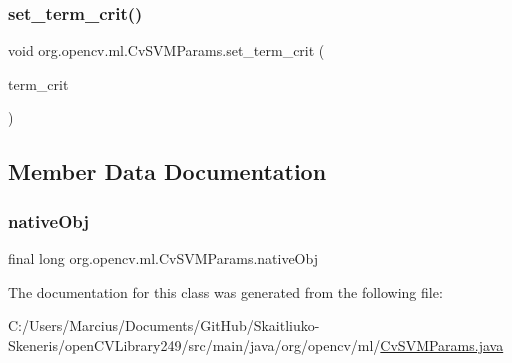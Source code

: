 \mbox{\label{classorg_1_1opencv_1_1ml_1_1_cv_s_v_m_params_a41fe4b04f6a9774bbd16c303a30f0f99}} 
\subsubsection{\texorpdfstring{set\+\_\+term\+\_\+crit()}{set\_term\_crit()}}
{\footnotesize\ttfamily void org.\+opencv.\+ml.\+Cv\+S\+V\+M\+Params.\+set\+\_\+term\+\_\+crit (\begin{DoxyParamCaption}\item[{\mbox{\hyperlink{classorg_1_1opencv_1_1core_1_1_term_criteria}{Term\+Criteria}}}]{term\+\_\+crit }\end{DoxyParamCaption})}



\subsection{Member Data Documentation}
\mbox{\label{classorg_1_1opencv_1_1ml_1_1_cv_s_v_m_params_a2b6bd458876048039fd8816de90f9a4c}} 
\subsubsection{\texorpdfstring{native\+Obj}{nativeObj}}
{\footnotesize\ttfamily final long org.\+opencv.\+ml.\+Cv\+S\+V\+M\+Params.\+native\+Obj\hspace{0.3cm}{\ttfamily [protected]}}



The documentation for this class was generated from the following file\+:\begin{DoxyCompactItemize}
\item 
C\+:/\+Users/\+Marcius/\+Documents/\+Git\+Hub/\+Skaitliuko-\/\+Skeneris/open\+C\+V\+Library249/src/main/java/org/opencv/ml/\mbox{\hyperlink{_cv_s_v_m_params_8java}{Cv\+S\+V\+M\+Params.\+java}}\end{DoxyCompactItemize}
